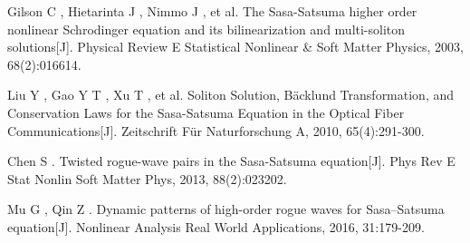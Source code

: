 \cleardoublepage
{}
{}
\nocite{*}
%

\begin{thebibliography}{0}

Gilson C , Hietarinta J , Nimmo J , et al. The Sasa-Satsuma higher order nonlinear Schrodinger equation and its bilinearization and multi-soliton solutions[J]. Physical Review E Statistical Nonlinear \& Soft Matter Physics, 2003, 68(2):016614.

Liu Y , Gao Y T , Xu T , et al. Soliton Solution, Bäcklund Transformation, and Conservation Laws for the Sasa-Satsuma Equation in the Optical Fiber Communications[J]. Zeitschrift Für Naturforschung A, 2010, 65(4):291-300.

Chen S . Twisted rogue-wave pairs in the Sasa-Satsuma equation[J]. Phys Rev E Stat Nonlin Soft Matter Phys, 2013, 88(2):023202.

Mu G , Qin Z . Dynamic patterns of high-order rogue waves for Sasa–Satsuma equation[J]. Nonlinear Analysis Real World Applications, 2016, 31:179-209.


\end{thebibliography}
\cleardoublepage
